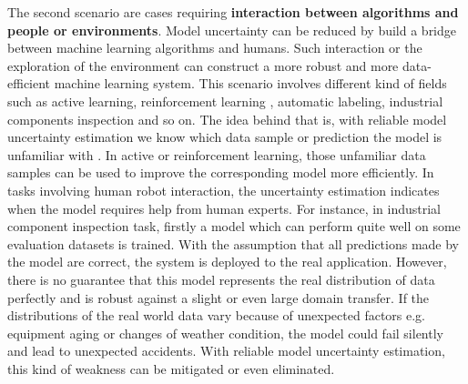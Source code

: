 The second scenario are cases requiring \textbf{interaction between algorithms and people or environments}. Model uncertainty can be reduced by build a bridge between machine learning algorithms and humans. Such interaction or the exploration of the environment can construct a more robust and more data-efficient machine learning system. This scenario involves different kind of fields such as active learning\cite{gal2017deep}, reinforcement learning\cite{blundell2015weight}\cite{osband2016deep}\cite{gal2016improving} , automatic labeling, industrial components inspection  and so on. The idea behind that is, with reliable model uncertainty estimation we know which data sample or prediction the model is unfamiliar with . In active or reinforcement learning, those unfamiliar data samples can be used to improve the corresponding model more efficiently. In tasks involving human robot interaction, the uncertainty estimation indicates when the model requires help from human experts. For instance, in industrial component inspection task, firstly a model which can perform quite well on some evaluation datasets is trained. With the assumption that all predictions made by the model are correct, the system is deployed to the real application.
However, there is no guarantee that this model represents the real distribution of data perfectly and is robust against a slight or even large domain transfer. If the distributions of the real world data vary because of unexpected factors e.g. equipment aging or changes of weather condition, the model could fail silently and lead to unexpected accidents. With reliable model uncertainty estimation, this kind of weakness can be mitigated or even eliminated. 

